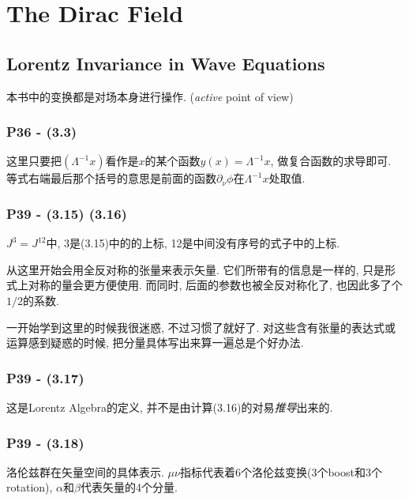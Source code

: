 \documentclass[cn,hazy,blue,11pt,device=normal,chinesefont=founder]{elegantnote}
\begin{document}
\clearpage

\section{The Dirac Field}

\subsection{Lorentz Invariance in Wave Equations}

\begin{note}
  本书中的变换都是对场本身进行操作. (\textit{active} point of view)
\end{note}

\subsubsection{P36 - (3.3)}

这里只要把$(\Lambda^{-1}x)$看作是$x$的某个函数$y(x) = \Lambda^{-1}x$, 做复合函数的求导即可. 等式右端最后那个括号的意思是前面的函数$\partial_{\nu}\phi$在$\Lambda^{-1}x$处取值. 

\subsubsection{P39 - (3.15) (3.16)}

$J^3 = J^{12}$中, 3是(3.15)中的的上标, 12是中间没有序号的式子中的上标. 

从这里开始会用全反对称的张量来表示矢量. 它们所带有的信息是一样的, 只是形式上对称的量会更方便使用. 而同时, 后面的参数也被全反对称化了, 也因此多了个$1/2$的系数. 

\begin{remark}
  一开始学到这里的时候我很迷惑, 不过习惯了就好了. 对这些含有张量的表达式或运算感到疑惑的时候, 把分量具体写出来算一遍总是个好办法. 
\end{remark}

\subsubsection{P39 - (3.17)}

这是Lorentz Algebra的定义, 并不是由计算(3.16)的对易\textit{推导}出来的. 

\subsubsection{P39 - (3.18)}

洛伦兹群在矢量空间的具体表示. $\mu\nu$指标代表着6个洛伦兹变换(3个boost和3个rotation), $\alpha$和$\beta$代表矢量的4个分量. 
\end{document}
